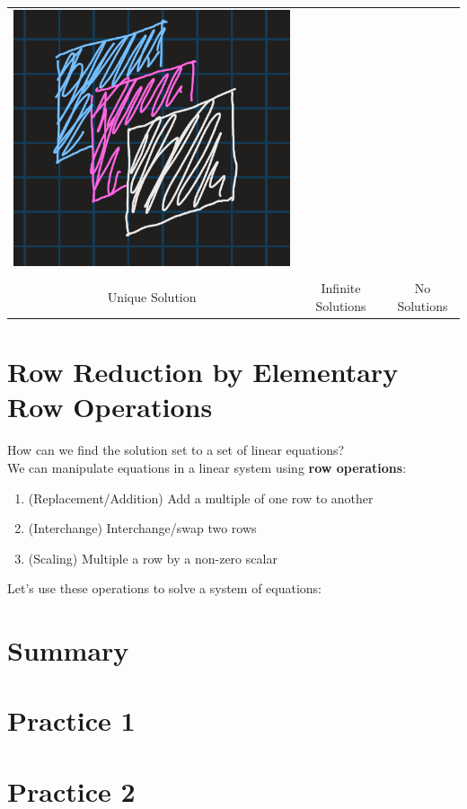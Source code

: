 \documentclass{article}
\begin{document}
\begin{tabular}{ c c c }
    \includegraphics[scale=0.25]{Images/1.1.graph6.png} \\
    \\
    Unique Solution &
    Infinite Solutions &
    No Solutions \\
\end{tabular}

\section{Row Reduction by Elementary Row Operations}
How can we find the solution set to a set of linear equations?
\\
We can manipulate equations in a linear system using \textbf{row operations}:
\begin{enumerate}
    \item (Replacement/Addition) Add a multiple of one row to another
    \item (Interchange) Interchange/swap two rows
    \item (Scaling) Multiple a row by a non-zero scalar
\end{enumerate}
Let's use these operations to solve a system of equations:


\section{Summary}

\section{Practice 1}

\section{Practice 2}
\end{document}
